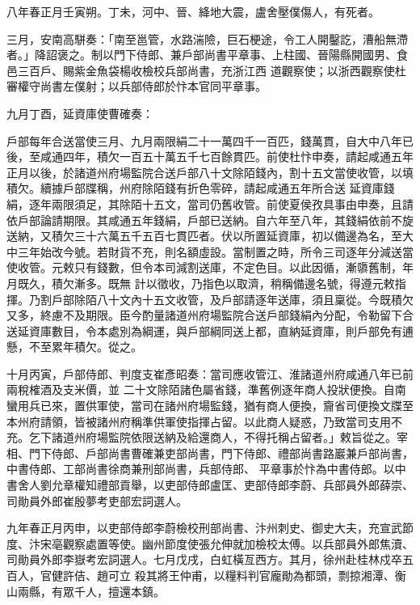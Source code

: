 \begin{pinyinscope}
 八年春正月壬寅朔。丁未，河中、晉、絳地大震，盧舍壓僕傷人，有死者。



 三月，安南高駢奏：「南至邕管，水路湍險，巨石梗途，令工人開鑿訖，漕船無滯者。」降詔褒之。制以門下侍郎、兼戶部尚書平章事、上柱國、晉陽縣開國男、食邑三百戶、賜紫金魚袋楊收檢校兵部尚書，充浙江西
 道觀察使；以浙西觀察使杜審權守尚書左僕射；以兵部侍郎於忭本官同平章事。



 九月丁酉，延資庫使曹確奏：



 戶部每年合送當使三月、九月兩限絹二十一萬四千一百匹，錢萬貫，自大中八年已後，至咸通四年，積欠一百五十萬五千七百餘貫匹。前使杜忭申奏，請起咸通五年正月以後，於諸道州府場監院合送戶部八十文除陌錢內，割十五文當使收管，以填積欠。續據戶部牒稱，州府除陌錢有折色零碎，請起咸通五年所合送
 延資庫錢絹，逐年兩限須足，其除陌十五文，當司仍舊收管。前使夏侯孜具事由申奏，且請依戶部論請期限。其咸通五年錢絹，戶部已送納。自六年至八年，其錢絹依前不旋送納，又積欠三十六萬五千五百七貫匹者。伏以所置延資庫，初以備邊為名，至大中三年始改今號。若財貨不充，則名額虛設。當制置之時，所令三司逐年分減送當使收管。元敕只有錢數，但令本司減割送庫，不定色目。以此因循，漸隳舊制，年月既久，積欠漸多。既無
 計以徵收，乃指色以取濟，稍稱備邊名號，得遵元敕指揮。乃割戶部除陌八十文內十五文收管，及戶部請逐年送庫，須且稟從。今既積欠又多，終慮不及期限。臣今酌量諸道州府場監院合送戶部錢絹內分配，令勒留下合送延資庫數目，令本處別為綱運，與戶部綱同送上都，直納延資庫，則戶部免有逋懸，不至累年積欠。從之。



 十月丙寅，戶部侍郎、判度支崔彥昭奏：當司應收管江、淮諸道州府咸通八年已前兩稅榷酒及支米價，並
 二十文除陌諸色屬省錢，準舊例逐年商人投狀便換。自南蠻用兵已來，置供軍使，當司在諸州府場監錢，猶有商人便換，齎省司便換文牒至本州府請領，皆被諸州府稱準供軍使指揮占留。以此商人疑惑，乃致當司支用不充。乞下諸道州府場監院依限送納及給還商人，不得托稱占留者。」敕旨從之。宰相、門下侍郎、戶部尚書曹確兼吏部尚書，門下侍郎、禮部尚書路巖兼戶部尚書，中書侍郎、工部尚書徐商兼刑部尚書，兵部侍郎、
 平章事於忭為中書侍郎。以中書舍人劉允章權知禮部貢舉，以吏部侍郎盧匡、吏部侍郎李蔚、兵部員外郎薛崇、司勛員外郎崔殷夢考吏部宏詞選人。



 九年春正月丙申，以吏部侍郎李蔚檢校刑部尚書、汴州刺史、御史大夫，充宣武節度、汴宋亳觀察處置等使。幽州節度使張允伸就加檢校太傅。以兵部員外郎焦瀆、司勛員外郎李嶽考宏詞選人。七月戊戌，白虹橫亙西方。其月，徐州赴桂林戍卒五百人，官健許佶、趙可立
 殺其將王仲甫，以糧料判官龐勛為都頭，剽掠湘潭、衡山兩縣，有眾千人，擅還本鎮。




\end{pinyinscope}
